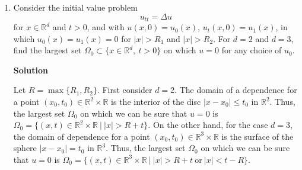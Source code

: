 \documentclass{article}
\begin{document}
\begin{enumerate}
\begin{enumerate}
\end{enumerate}



\item Consider the initial value problem
\[u_{tt} = \Delta u\]
for \(x \in \mathbb{R}^d\) and \(t > 0\), and with \(u(x,0) = u_0(x)\), \(u_t(x,0) = u_1(x)\), in which \(u_0(x) = u_1(x) = 0\) for \(|x| > R_1\) and \(|x| > R_2\).  For \(d = 2\) and \(d = 3\), find the largest set \(\Omega_0 \subset \{x \in \mathbb{R}^d, \ t > 0\}\) on which \(u = 0\) for any choice of \(u_0\).

{\bf Solution}

Let \(R = \max \{R_1, R_2\}\).  First consider \(d = 2\).  The domain of a dependence for a point \((x_0,t_0) \in \mathbb{R}^2 \times \mathbb{R}\) is the interior of the disc \(|x - x_0| \leq t_0\) in \(\mathbb{R}^2\).  Thus, the largest set \(\Omega_0\) on which we can be sure that \(u = 0\) is \(\Omega_0 = \{(x,t) \in \mathbb{R}^2 \times \mathbb{R} \ | \ |x| > R + t\}\).  On the other hand, for the case \(d = 3\), the domain of dependence for a point \((x_0,t_0) \in \mathbb{R}^3 \times \mathbb{R}\) is the surface of the sphere \(|x - x_0| = t_0\) in \(\mathbb{R}^3\).  Thus, the largest set \(\Omega_0\) on which we can be sure that \(u = 0\) is \(\Omega_0 = \{(x,t) \in \mathbb{R}^3 \times \mathbb{R} \ | \ |x| > R + t \ \text{or} \ |x| < t - R\}\).



\end{enumerate}
\end{document}
